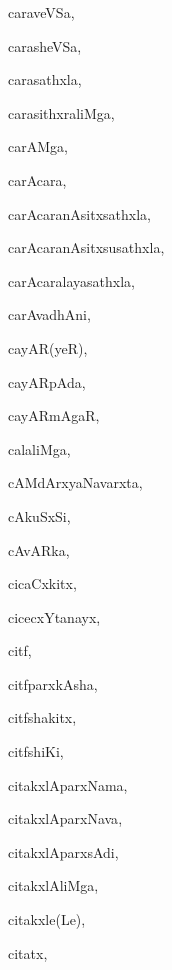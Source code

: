 \begin{multicols}{3}
{\noindent
{caraveVSa}, \pageref{caraveVSa}

\noindent
{carasheVSa}, \pageref{carasheVSa}

\noindent
{carasathxla}, \pageref{carasathxla}

\noindent
{carasithxraliMga}, \pageref{carasithxraliMga}

\noindent
{carAMga}, \pageref{carAMga}

\noindent
{carAcara}, \pageref{carAcara}

\noindent
{carAcaranAsitxsathxla}, \pageref{carAcaranAsitxsathxla}

\noindent
{carAcaranAsitxsusathxla}, \pageref{carAcaranAsitxsusathxla}

\noindent
{carAcaralayasathxla}, \pageref{carAcaralayasathxla}

\noindent
{carAvadhAni}, \pageref{carAvadhAni}

\noindent
{cayAR(yeR)}, \pageref{cayAR(yeR)}

\noindent
{cayARpAda}, \pageref{cayARpAda}

\noindent
{cayARmAgaR}, \pageref{cayARmAgaR}

\noindent
{calaliMga}, \pageref{calaliMga}

\noindent
{cAMdArxyaNavarxta}, \pageref{cAMdArxyaNavarxta}

\noindent
{cAkuSxSi}, \pageref{cAkuSxSi}

\noindent
{cAvARka}, \pageref{cAvARka}

\noindent
{cicaCxkitx}, \pageref{cicaCxkitx}

\noindent
{cicecxYtanayx}, \pageref{cicecxYtanayx}

\noindent
{citf}, \pageref{citf}

\noindent
{citfparxkAsha}, \pageref{citfparxkAsha}

\noindent
{citfshakitx}, \pageref{citfshakitx}

\noindent
{citfshiKi}, \pageref{citfshiKi}

\noindent
{citakxlAparxNama}, \pageref{citakxlAparxNama}

\noindent
{citakxlAparxNava}, \pageref{citakxlAparxNava}

\noindent
{citakxlAparxsAdi}, \pageref{citakxlAparxsAdi}

\noindent
{citakxlAliMga}, \pageref{citakxlAliMga}

\noindent
{citakxle(Le)}, \pageref{citakxle(Le)}

\noindent
{citatx}, \pageref{citatx}

}
\end{multicols}
